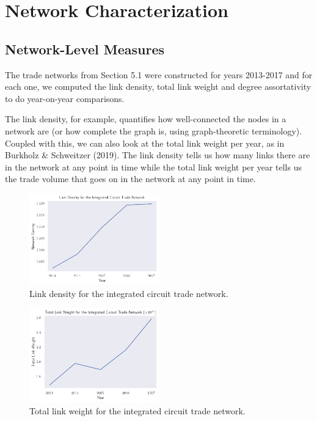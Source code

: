 \documentclass[12pt,letterpaper]{report}
\begin{document}
	\section{Network Characterization}
	\label{sec:52networkCharacterization}
	
		\subsection{Network-Level Measures}
		\label{ssec:521networkLevel}
		
		The trade networks from Section 5.1 were constructed for years 2013-2017 and for each one, we computed the link density, total link weight and degree assortativity to do year-on-year comparisons. 
		
		The link density, for example, quantifies how well-connected the nodes in a network are (or how complete the graph is, using graph-theoretic terminology). Coupled with this, we can also look at the total link weight per year, as in Burkholz \& Schweitzer (2019). The link density tells us how many links there are in the network at any point in time while the total link weight per year tells us the trade volume that goes on in the network at any point in time.
		
		\begin{figure}[!h]
			\centering
			\includegraphics[width=0.5\textwidth]{Fig502-LinkDensity.png}
			\caption{Link density for the integrated circuit trade network.}\label{fig:502LinkDensity}
		\end{figure}
	
		\begin{figure}[!h]
			\centering
			\includegraphics[width=0.5\textwidth]{Fig503-TotalLinkWeight.png}
			\caption{Total link weight for the integrated circuit trade network.}\label{fig:503TotalLinkWeight}
		\end{figure}
			
\end{document}
